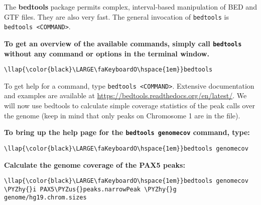 \documentclass[11pt]{article}
\def\PYZus{\char`\_}
\def\PYZhy{\char`\-}
\begin{document}
    The \textbf{bedtools} package permits complex, interval-based
manipulation of BED and GTF files. They are also very fast. The general
invocation of \texttt{bedtools} is
\texttt{bedtools\ \textless{}COMMAND\textgreater{}}.

\textbf{To get an overview of the available commands, simply call
\texttt{bedtools} without any command or options in the terminal
window.}





\begin{terminalinput}
\begin{Verbatim}[commandchars=\\\{\}]
\llap{\color{black}\LARGE\faKeyboardO\hspace{1em}}bedtools
\end{Verbatim}
\end{terminalinput}



    To get help for a command, type
\texttt{bedtools\ \textless{}COMMAND\textgreater{}}. Extensive
documentation and examples are available at
\url{https://bedtools.readthedocs.org/en/latest/}. We will now use
bedtools to calculate simple coverage statistics of the peak calls over
the genome (keep in mind that only peaks on Chromosome 1 are in the
file).

\textbf{To bring up the help page for the \texttt{bedtools\ genomecov}
command, type:}





\begin{terminalinput}
\begin{Verbatim}[commandchars=\\\{\}]
\llap{\color{black}\LARGE\faKeyboardO\hspace{1em}}bedtools genomecov
\end{Verbatim}
\end{terminalinput}



    \textbf{Calculate the genome coverage of the PAX5 peaks:}





\begin{terminalinput}
\begin{Verbatim}[commandchars=\\\{\}]
\llap{\color{black}\LARGE\faKeyboardO\hspace{1em}}bedtools genomecov \PYZhy{}i PAX5\PYZus{}peaks.narrowPeak \PYZhy{}g genome/hg19.chrom.sizes
\end{Verbatim}
\end{terminalinput}
\end{document}
